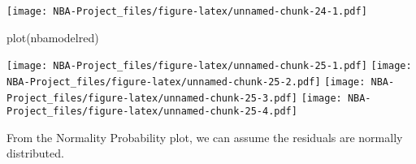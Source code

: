 \documentclass[
]{article}
\newenvironment{Shaded}{\begin{snugshade}}{\end{snugshade}}
\newcommand{\FunctionTok}[1]{\textcolor[rgb]{0.00,0.00,0.00}{#1}}
\newcommand{\NormalTok}[1]{#1}
\begin{document}
\texttt{[image: NBA-Project\_files/figure-latex/unnamed-chunk-24-1.pdf]}

\begin{Shaded}
\begin{Highlighting}[]
\FunctionTok{plot}\NormalTok{(nbamodelred)}
\end{Highlighting}
\end{Shaded}

\texttt{[image: NBA-Project\_files/figure-latex/unnamed-chunk-25-1.pdf]}
\texttt{[image: NBA-Project\_files/figure-latex/unnamed-chunk-25-2.pdf]}
\texttt{[image: NBA-Project\_files/figure-latex/unnamed-chunk-25-3.pdf]}
\texttt{[image: NBA-Project\_files/figure-latex/unnamed-chunk-25-4.pdf]}

From the Normality Probability plot, we can assume the residuals are
normally distributed.
\end{document}
